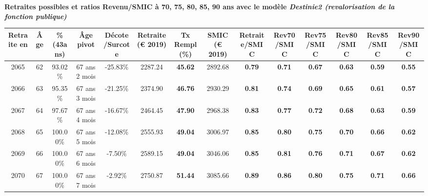  \vspace{0.1cm} 
{\bf \noindent Retraites possibles et ratios Revenu/SMIC à 70, 75, 80, 85, 90 ans avec le modèle \emph{Destinie2 (revalorisation de la fonction publique)}}  
 
\begin{adjustbox}{max width=\textwidth} 
\begin{tabular}[htb]{|c|c||c|c|c||c|c||c||c|c|c|c|c|c|} 
\hline 
 Retraite en &  Âge &  \%(43ans) &  Âge pivot &  Décote/Surcote &  Retraite (\euro{} 2019) &  Tx Rempl(\%) &  SMIC (\euro{} 2019) &  Retraite/SMIC &  Rev70/SMIC &  Rev75/SMIC &  Rev80/SMIC &  Rev85/SMIC &  Rev90/SMIC \\ 
\hline \hline 
 2065 &  62 &  93.02\% &  67 ans 2 mois &  -25.83\% &  2287.24 &  {\bf 45.62} &  2892.68 &  {\bf {\color{red} 0.79}} &  {\bf {\color{red} 0.71}} &  {\bf {\color{red} 0.67}} &  {\bf {\color{red} 0.63}} &  {\bf {\color{red} 0.59}} &  {\bf {\color{red} 0.55}} \\ 
\hline 
 2066 &  63 &  95.35\% &  67 ans 3 mois &  -21.25\% &  2374.90 &  {\bf 46.76} &  2930.29 &  {\bf {\color{red} 0.81}} &  {\bf {\color{red} 0.74}} &  {\bf {\color{red} 0.69}} &  {\bf {\color{red} 0.65}} &  {\bf {\color{red} 0.61}} &  {\bf {\color{red} 0.57}} \\ 
\hline 
 2067 &  64 &  97.67\% &  67 ans 4 mois &  -16.67\% &  2464.45 &  {\bf 47.90} &  2968.38 &  {\bf {\color{red} 0.83}} &  {\bf {\color{red} 0.77}} &  {\bf {\color{red} 0.72}} &  {\bf {\color{red} 0.68}} &  {\bf {\color{red} 0.63}} &  {\bf {\color{red} 0.59}} \\ 
\hline 
 2068 &  65 &  100.00\% &  67 ans 5 mois &  -12.08\% &  2555.93 &  {\bf 49.04} &  3006.97 &  {\bf {\color{red} 0.85}} &  {\bf {\color{red} 0.80}} &  {\bf {\color{red} 0.75}} &  {\bf {\color{red} 0.70}} &  {\bf {\color{red} 0.66}} &  {\bf {\color{red} 0.62}} \\ 
\hline 
 2069 &  66 &  100.00\% &  67 ans 6 mois &  -7.50\% &  2589.15 &  {\bf 49.04} &  3046.06 &  {\bf {\color{red} 0.85}} &  {\bf {\color{red} 0.81}} &  {\bf {\color{red} 0.76}} &  {\bf {\color{red} 0.71}} &  {\bf {\color{red} 0.67}} &  {\bf {\color{red} 0.62}} \\ 
\hline 
 2070 &  67 &  100.00\% &  67 ans 7 mois &  -2.92\% &  2750.87 &  {\bf 51.44} &  3085.66 &  {\bf {\color{red} 0.89}} &  {\bf {\color{red} 0.86}} &  {\bf {\color{red} 0.80}} &  {\bf {\color{red} 0.75}} &  {\bf {\color{red} 0.71}} &  {\bf {\color{red} 0.66}} \\ 
\hline 
\hline 
\end{tabular} 
\end{adjustbox} 
 

